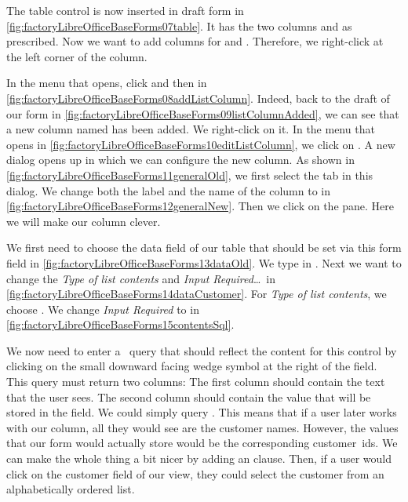 The table control is now inserted in draft form in \cref{fig:factoryLibreOfficeBaseForms07table}.
It has the two columns  and  as prescribed.
Now we want to add columns for  and .
Therefore, we right-click at the left corner of the  column.

In the menu that opens, click  and then  in \cref{fig:factoryLibreOfficeBaseForms08addListColumn}.
Indeed, back to the draft of our form in \cref{fig:factoryLibreOfficeBaseForms09listColumnAdded}, we can see that a new column named  has been added.
We right-click on it.
In the menu that opens in \cref{fig:factoryLibreOfficeBaseForms10editListColumn}, we click on .
A new dialog opens up in which we can configure the new column.
As shown in \cref{fig:factoryLibreOfficeBaseForms11generalOld}, we first select the  tab in this dialog.
We change both the label and the name of the column to  in \cref{fig:factoryLibreOfficeBaseForms12generalNew}.
Then we click on the  pane.
Here we will make our column clever.

We first need to choose the data field of our  table that should be set via this form field in \cref{fig:factoryLibreOfficeBaseForms13dataOld}.
We type in .
Next we want to change the \emph{Type of list contents} and \emph{Input Required}\dots\ in \cref{fig:factoryLibreOfficeBaseForms14dataCustomer}.
For \emph{Type of list contents}, we choose .
We change \emph{Input Required} to  in \cref{fig:factoryLibreOfficeBaseForms15contentsSql}.

We now need to enter a \sql\ query that should reflect the content for this control by clicking on the small downward facing wedge symbol at the right of the  field.
This query must return two columns:
The first column should contain the text that the user sees.
The second column should contain the value that will be stored in the  field.
We could simply query .
This means that if a user later works with our column, all they would see are the customer names.
However, the values that our form would actually store would be the corresponding customer~ids.
We can make the whole thing a bit nicer by adding an  clause.
Then, if a user would click on the customer field of our view, they could select the customer from an alphabetically ordered list.


